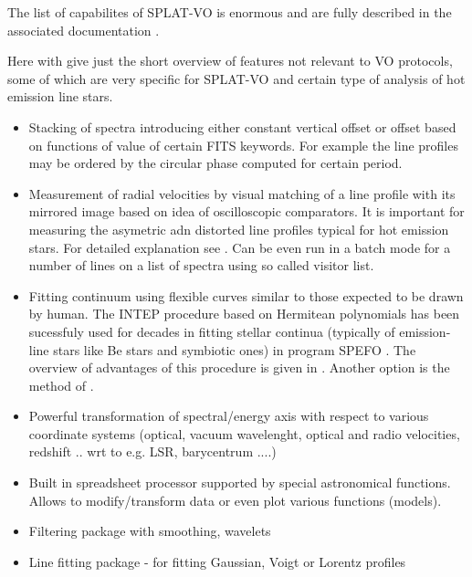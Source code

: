 \documentclass[final,authoryear,5p,times,twocolumn]{elsarticle}
\begin{document}
The list of capabilites of SPLAT-VO is enormous and are fully described in
the associated documentation \citep[SUN/243;][]{sun243}.

Here with give just the short overview of features not relevant to VO
protocols, some of which are very
specific for SPLAT-VO and certain type of analysis of hot emission line stars.

\begin{itemize}

\item Stacking of spectra introducing either constant vertical offset or
offset based on functions of value of certain FITS keywords. For example the
line profiles may be ordered by the circular phase computed for certain
period.

\item Measurement of radial velocities by visual matching of a line profile
with its mirrored image based on idea of oscilloscopic comparators. It is
important for measuring the asymetric adn distorted line profiles typical for
hot emission stars. For detailed explanation see \citet{2007IAUS..240..486P}.
Can be even run in a batch mode for a number of lines on a list of spectra
using so called visitor list.

\item Fitting continuum using flexible curves similar to those expected to be
drawn by human.  The  INTEP procedure based on Hermitean polynomials
\citep{1982PDAO...16...67H} has been sucessfuly used for decades in fitting stellar
continua (typically of emission-line stars like Be stars and symbiotic ones)
in program SPEFO \citep{1996ASPC..101..187S}. The overview of advantages of
this procedure is given in \citet{2008asvo.proc...97S}. Another option is the
method of \citet{Akima:1970:NMI:321607.321609}.

\item Powerful transformation of spectral/energy axis with respect to various
coordinate systems (optical, vacuum wavelenght, optical and radio velocities,
redshift .. wrt to e.g. LSR, barycentrum ....)

\item Built in spreadsheet processor supported by special astronomical
functions. Allows to modify/transform data or even plot various functions
(models).

\item Filtering package with smoothing, wavelets

\item Line fitting package - for fitting Gaussian, Voigt or Lorentz profiles


\end{itemize}
\end{document}
